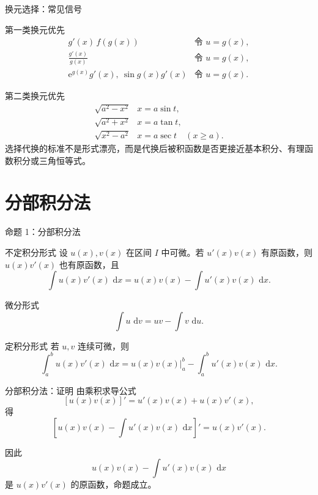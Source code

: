 \documentclass[aspectratio=169,10pt]{ctexbeamer}
\newcommand{\dd}{\,\mathrm{d}}
\newcommand{\ee}{\mathrm{e}}
\begin{document}
\begin{frame}[t]{换元选择：常见信号}
\small
\begin{block}{第一类换元优先}
\[
\begin{array}{ll}
g'(x)\,f(g(x)) & \text{令 } u=g(x),\\[1mm]
\frac{g'(x)}{g(x)} & \text{令 } u=g(x),\\[1mm]
\ee^{g(x)}g'(x),\ \sin g(x)g'(x) & \text{令 } u=g(x).
\end{array}
\]
\end{block}

\begin{block}{第二类换元优先}
\[
\begin{array}{ll}
\sqrt{a^2-x^2} & x=a\sin t,\\[1mm]
\sqrt{a^2+x^2} & x=a\tan t,\\[1mm]
\sqrt{x^2-a^2} & x=a\sec t\quad (x\ge a).
\end{array}
\]
选择代换的标准不是形式漂亮，而是代换后被积函数是否更接近基本积分、有理函数积分或三角恒等式。
\end{block}
\end{frame}

\section{分部积分法}

\begin{frame}[t]{命题 1：分部积分法}
\small
\begin{block}{不定积分形式}
设 $u(x),v(x)$ 在区间 $I$ 中可微。若 $u'(x)v(x)$ 有原函数，则 $u(x)v'(x)$ 也有原函数，且
\[
  \int u(x)v'(x)\,\dd x
  =u(x)v(x)-\int u'(x)v(x)\,\dd x.
\]
\end{block}

\begin{block}{微分形式}
\[
  \int u\,\dd v=uv-\int v\,\dd u.
\]
\end{block}

\begin{block}{定积分形式}
若 $u,v$ 连续可微，则
\[
  \int_a^b u(x)v'(x)\,\dd x
  =u(x)v(x)\bigg|_a^b-\int_a^b u'(x)v(x)\,\dd x.
\]
\end{block}
\end{frame}

\begin{frame}[t]{分部积分法：证明}
\small
由乘积求导公式
\[
  [u(x)v(x)]'=u'(x)v(x)+u(x)v'(x),
\]
得
\[
  \left[u(x)v(x)-\int u'(x)v(x)\,\dd x\right]'=u(x)v'(x).
\]

\vspace{0.5em}
因此
\[
  u(x)v(x)-\int u'(x)v(x)\,\dd x
\]
是 $u(x)v'(x)$ 的原函数，命题成立。
\end{frame}
\end{document}
